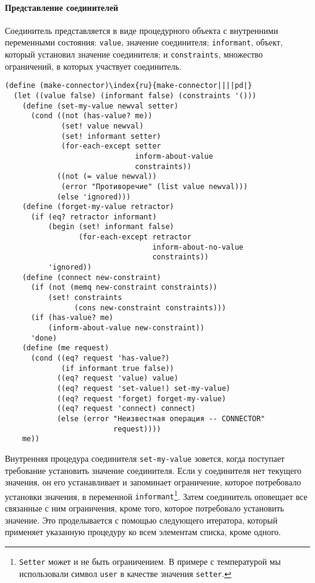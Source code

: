 \paragraph{Представление соединителей}


Соединитель представляется в виде процедурного объекта с
внутренними  переменными  состояния: {\tt value}, значение
соединителя; {\tt informant}, объект, который установил
значение соединителя; и {\tt constraints}, множество
ограничений, в которых участвует соединитель.

\begin{Verbatim}[fontsize=\small]
(define (make-connector)\index{ru}{make-connector||||pd|}
  (let ((value false) (informant false) (constraints '()))
    (define (set-my-value newval setter)
      (cond ((not (has-value? me))
             (set! value newval)
             (set! informant setter)
             (for-each-except setter
                              inform-about-value
                              constraints))
            ((not (= value newval))
             (error "Противоречие" (list value newval)))
            (else 'ignored)))
    (define (forget-my-value retractor)
      (if (eq? retractor informant)
          (begin (set! informant false)
                 (for-each-except retractor
                                  inform-about-no-value
                                  constraints))
          'ignored))
    (define (connect new-constraint)
      (if (not (memq new-constraint constraints))
          (set! constraints
                (cons new-constraint constraints)))
      (if (has-value? me)
          (inform-about-value new-constraint))
      'done)
    (define (me request)
      (cond ((eq? request 'has-value?)
             (if informant true false))
            ((eq? request 'value) value)
            ((eq? request 'set-value!) set-my-value)
            ((eq? request 'forget) forget-my-value)
            ((eq? request 'connect) connect)
            (else (error "Неизвестная операция -- CONNECTOR"
                         request))))
    me))
\end{Verbatim}
Внутренняя процедура соединителя {\tt set-my-value} зовется,
когда поступает требование установить значение соединителя.  Если у
соединителя нет текущего значения, он его устанавливает и
запоминает ограничение, которое потребовало установки значения, в
переменной {\tt informant}\footnote{{\tt Setter} может и не быть
ограничением.  В примере с температурой мы использовали символ
{\tt user} в качестве значения {\tt setter}.
}.
Затем соединитель оповещает все связанные с ним ограничения, кроме
того, которое потребовало установить значение.  Это проделывается с
помощью следующего итератора, который применяет указанную процедуру ко
всем элементам списка, кроме одного.

